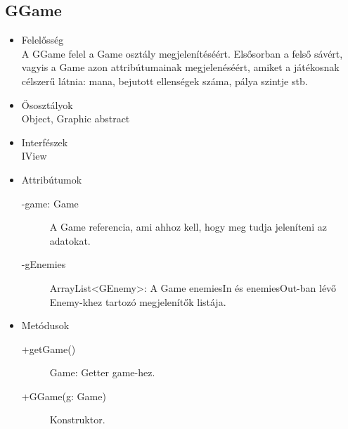 \subsection{GGame}
\begin{itemize}
\item Felelősség\\
A GGame felel a Game osztály megjelenítéséért. Elsősorban a felső sávért, vagyis a Game azon attribútumainak megjelenéséért, amiket a játékosnak célszerű látnia: mana, bejutott ellenségek száma, pálya szintje stb. 
\item Ősosztályok\\
Object, Graphic abstract
\item Interfészek\\
IView
\item Attribútumok
	\begin{description}
		\item[-game: Game] A Game referencia, ami ahhoz kell, hogy meg tudja jeleníteni az adatokat.
		\item[-gEnemies] ArrayList<GEnemy>: A Game enemiesIn és enemiesOut-ban lévő Enemy-khez tartozó megjelenítők listája. 
\end{description}
\item Metódusok
	\begin{description}
		\item[+getGame()] Game: Getter game-hez.
		\item[+GGame(g: Game)] Konstruktor.
	\end{description}
\end{itemize}

